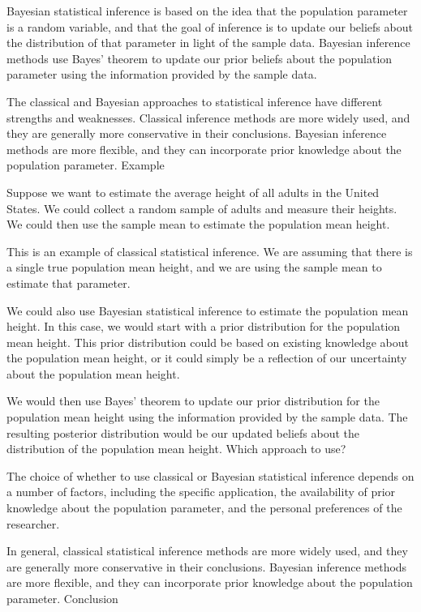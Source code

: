 \documentclass[12pt,a4paper]{article}
\theoremstyle{example}
\theoremstyle{definition}
\theoremstyle{theorem}
\begin{document}
Bayesian statistical inference is based on the idea that the population parameter is a random variable, and that the goal of inference is to update our beliefs about the distribution of that parameter in light of the sample data. Bayesian inference methods use Bayes' theorem to update our prior beliefs about the population parameter using the information provided by the sample data.

The classical and Bayesian approaches to statistical inference have different strengths and weaknesses. Classical inference methods are more widely used, and they are generally more conservative in their conclusions. Bayesian inference methods are more flexible, and they can incorporate prior knowledge about the population parameter.
Example

Suppose we want to estimate the average height of all adults in the United States. We could collect a random sample of adults and measure their heights. We could then use the sample mean to estimate the population mean height.

This is an example of classical statistical inference. We are assuming that there is a single true population mean height, and we are using the sample mean to estimate that parameter.

We could also use Bayesian statistical inference to estimate the population mean height. In this case, we would start with a prior distribution for the population mean height. This prior distribution could be based on existing knowledge about the population mean height, or it could simply be a reflection of our uncertainty about the population mean height.

We would then use Bayes' theorem to update our prior distribution for the population mean height using the information provided by the sample data. The resulting posterior distribution would be our updated beliefs about the distribution of the population mean height.
Which approach to use?

The choice of whether to use classical or Bayesian statistical inference depends on a number of factors, including the specific application, the availability of prior knowledge about the population parameter, and the personal preferences of the researcher.

In general, classical statistical inference methods are more widely used, and they are generally more conservative in their conclusions. Bayesian inference methods are more flexible, and they can incorporate prior knowledge about the population parameter.
Conclusion
\end{document}
